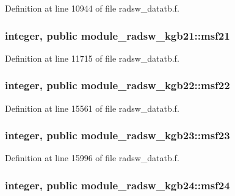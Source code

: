 Definition at line 10944 of file radsw\+\_\+datatb.\+f.

\subsubsection[{\texorpdfstring{msf21}{msf21}}]{\setlength{\rightskip}{0pt plus 5cm}integer, public module\+\_\+radsw\+\_\+kgb21\+::msf21}\hypertarget{group__module__radsw__main_gae70b5abfa847419cbf189d2502c34ddd}{}\label{group__module__radsw__main_gae70b5abfa847419cbf189d2502c34ddd}


Definition at line 11715 of file radsw\+\_\+datatb.\+f.

\subsubsection[{\texorpdfstring{msf22}{msf22}}]{\setlength{\rightskip}{0pt plus 5cm}integer, public module\+\_\+radsw\+\_\+kgb22\+::msf22}\hypertarget{group__module__radsw__main_ga0903a020c9e4a4f7c21911d2ab98fd46}{}\label{group__module__radsw__main_ga0903a020c9e4a4f7c21911d2ab98fd46}


Definition at line 15561 of file radsw\+\_\+datatb.\+f.

\subsubsection[{\texorpdfstring{msf23}{msf23}}]{\setlength{\rightskip}{0pt plus 5cm}integer, public module\+\_\+radsw\+\_\+kgb23\+::msf23}\hypertarget{group__module__radsw__main_gab96959c26232963a568609451483843e}{}\label{group__module__radsw__main_gab96959c26232963a568609451483843e}


Definition at line 15996 of file radsw\+\_\+datatb.\+f.

\subsubsection[{\texorpdfstring{msf24}{msf24}}]{\setlength{\rightskip}{0pt plus 5cm}integer, public module\+\_\+radsw\+\_\+kgb24\+::msf24}\hypertarget{group__module__radsw__main_ga52d0fde0af1d5427acf0d1924f393cdc}{}\label{group__module__radsw__main_ga52d0fde0af1d5427acf0d1924f393cdc}


